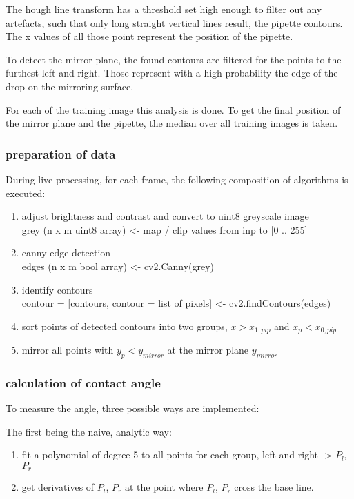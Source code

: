 The hough line transform has a threshold set high enough to filter out any artefacts, such that only long straight vertical lines result, the pipette contours.
The x values of all those point represent the position of the pipette.

To detect the mirror plane, the found contours are filtered for the points to the furthest left and right.
Those represent with a high probability the edge of the drop on the mirroring surface.


For each of the training image this analysis is done. To get the final position of the mirror plane and the pipette, the median over all training images is taken.


\subsubsection{preparation of data}

During live processing, for each frame, the following composition of algorithms is executed:


\begin{enumerate}
	\item adjust brightness and contrast and convert to uint8 greyscale image\\
        grey (n x m uint8 array) <- map / clip values from inp to [0 .. 255]
  \item canny edge detection\\
        edges (n x m bool array) <- cv2.Canny(grey)
  \item identify contours\\
        contour = [contours, contour = list of pixels] <- cv2.findContours(edges)
  \item sort points of detected contours into two groups, $x>x_{1,pip}$ and $x_p<x_{0,pip}$
  \item mirror all points with $y_p<y_{mirror}$ at the mirror plane $y_{mirror}$
\end{enumerate}


\subsubsection{calculation of contact angle}

To measure the angle, three possible ways are implemented:

The first being the naive, analytic way:
\begin{enumerate}
  \item fit a polynomial of degree 5 to all points for each group, left and right -> $P_l$, $P_r$
  \item get derivatives of $P_l$, $P_r$ at the point where $P_l$, $P_r$ cross the base line.
\end{enumerate}

